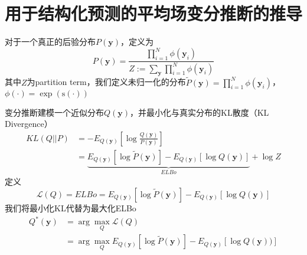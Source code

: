 \chapter{用于结构化预测的平均场变分推断的推导}
\label{appendix:mfvi-derivation}
对于一个真正的后验分布$P(\boldsymbol{y})$，定义为
\begin{equation}\label{eq:posterior}
    P(\boldsymbol{y}) =\frac{\prod_{i=1}^{N} \phi(\boldsymbol{y}_i)}{Z:=\sum_{\boldsymbol{y}}\prod_{i=1}^{N} \phi(\boldsymbol{y}_i)}
\end{equation}
其中$Z$为partition term，我们定义未归一化的分布$\tilde{P}(\boldsymbol{y})=\prod_{i=1}^{N} \phi(\boldsymbol{y}_i)$，$\phi(\cdot)=\exp(\mathrm{s}(\cdot))$

变分推断建模一个近似分布$Q(\boldsymbol{y})$，并最小化与真实分布的KL散度（KL Divergence）
\begin{equation}
    \begin{split}
        KL(Q||P)
        &=-E_{Q(\boldsymbol{y})}\left[\log\frac{Q(\boldsymbol{y})}{P(\boldsymbol{y})}\right]\\
        &=\underbrace{E_{Q(\boldsymbol{y})}\left[\log \tilde{P}(\boldsymbol{y})\right]-E_{Q(\boldsymbol{y})}\left[\log Q(\boldsymbol{y})\right]}_{ELBo}+\log Z
    \end{split}
\end{equation}
定义
\begin{equation}
    \mathcal{L}(Q)=ELBo=E_{Q(\boldsymbol{y})}\left[\log \tilde{P}(\boldsymbol{y})\right]-E_{Q(\boldsymbol{y})}\left[\log Q(\boldsymbol{y})\right]
\end{equation}
我们将最小化KL代替为最大化ELBo
\begin{equation}
    \begin{split}
        Q^{\ast}(\boldsymbol{y}) &= \arg\max_{Q}\mathcal{L}(Q)\\
        &= \arg\max_{Q}E_{Q(\boldsymbol{y})}\left[\log \tilde{P}(\boldsymbol{y})\right]-E_{Q(\boldsymbol{y})}\left[\log Q(\boldsymbol{y}))\right]
    \end{split}
\end{equation}


